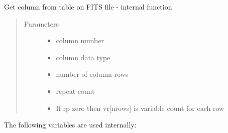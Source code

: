 \documentclass[letterpaper,10pt,english]{sphinxmanual}
\begin{document}
\begin{fulllineitems}
\label{\detokenize{qfits_functions:qfits.fitsgcol}}
Get column from table on FITS file - internal function
\begin{quote}\begin{description}
\item[{Parameters}] \leavevmode\begin{itemize}
\item {} 
 \textendash{} column number

\item {} 
 \textendash{} column data type

\item {} 
 \textendash{} number of column rows

\item {} 
 \textendash{} repeat count

\item {} 
 \textendash{} If rp zero then vr{[}nrows{]} is variable count for each row

\end{itemize}

\end{description}\end{quote}
\begin{description}
\item[{The following variables are used internally:}] \leavevmode
{}

\end{description}

\end{fulllineitems}
\end{document}
